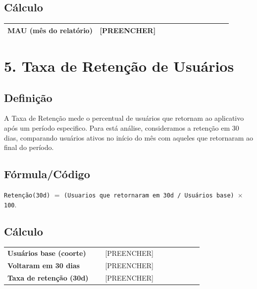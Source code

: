 \documentclass[12pt]{article}
\providecommand{\MAU}{[PREENCHER]}
\providecommand{\RetencaoBase}{[PREENCHER]}
\providecommand{\RetencaoRetornaram}{[PREENCHER]}
\providecommand{\RetencaoTaxa}{[PREENCHER]}
\begin{document}
\subsection*{Cálculo}
\begin{center}
\begin{tabular}{>{\bfseries}p{0.37\linewidth} p{0.53\linewidth}}
\toprule
MAU (mês do relatório) & \MAU \\
\bottomrule
\end{tabular}
\end{center}

\section*{5. Taxa de Retenção de Usuários}
\subsection*{Definição}
A Taxa de Retenção mede o percentual de usuários que retornam ao aplicativo após um período especifico. Para está análise, consideramos a retenção em 30 dias, comparando usuários ativos no início do mês com aqueles que retornaram ao final do período.

\subsection*{Fórmula/Código}
\noindent \texttt{Retenção(30d)} $=$ \texttt{(Usuarios que retornaram em 30d / Usuários base) $\times$ 100}.

\subsection*{Cálculo}
\begin{center}
\begin{tabular}{>{\bfseries}p{0.45\linewidth} p{0.45\linewidth}}
\toprule
Usuários base (coorte) & \RetencaoBase \\
Voltaram em 30 dias & \RetencaoRetornaram \\
Taxa de retenção (30d) & \RetencaoTaxa \\
\bottomrule
\end{tabular}
\end{center}

\end{document}
